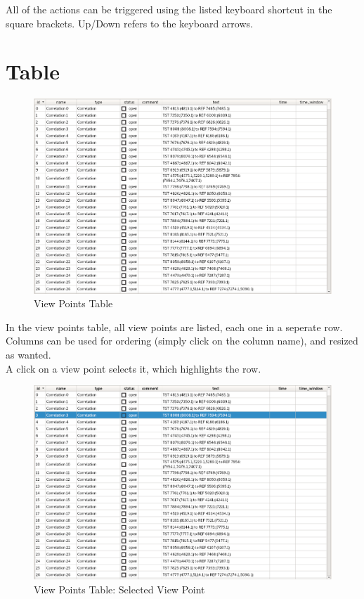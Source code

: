 All of the actions can be triggered using the listed keyboard shortcut in the square brackets. Up/Down refers to the keyboard arrows.

\section{Table}

\begin{figure}[H]
    \hspace*{-2cm}
    \includegraphics[width=18cm,frame]{../screenshots/view_points_table.png}
  \caption{View Points Table}
\end{figure}

In the view points table, all view points are listed, each one in a seperate row. Columns can be used for ordering (simply click on the column name), and resized as wanted. \\

A click on a view point selects it, which highlights the row.

\begin{figure}[H]
    \hspace*{-2cm}
    \includegraphics[width=18cm,frame]{../screenshots/view_points_table_selected.png}
  \caption{View Points Table: Selected View Point}
\end{figure}

